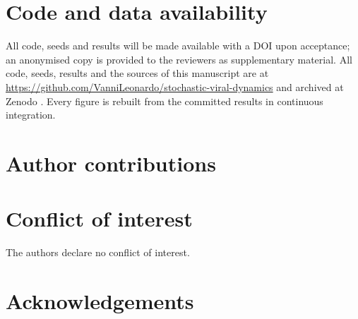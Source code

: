\section*{Code and data availability}
\ifanon
  All code, seeds and results will be made available with a DOI upon acceptance; an anonymised copy is provided to the reviewers as supplementary material.
\else
  All code, seeds, results and the sources of this manuscript are at \url{https://github.com/VanniLeonardo/stochastic-viral-dynamics} and archived at Zenodo . Every figure is rebuilt from the committed results in continuous integration.
\fi

\section*{Author contributions}

\section*{Conflict of interest}
The authors declare no conflict of interest.

\section*{Acknowledgements}
\ifanon
\else
\fi
